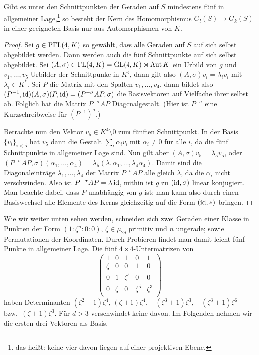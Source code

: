 \begin{lemma}
Gibt es unter den Schnittpunkten der Geraden auf $S$ mindestens fünf in allgemeiner Lage,\footnote{das heißt: keine vier davon liegen auf einer projektiven Ebene.} so besteht der Kern des Homomorphismus $G_l(S) \to G_k(S)$ in einer geeigneten Basis nur aus Automorphismen von $K$.
\end{lemma}
\begin{proof}
Sei $g \in \mathrm{P\Gamma L}(4,K)$ so gewählt, dass alle Geraden auf $S$ auf sich selbst abgebildet werden. Dann werden auch die fünf Schnittpunkte auf sich selbst abgebildet. Sei $(A, \sigma) \in \mathrm{\Gamma L}(4,K) = \mathrm{GL}(4,K) \rtimes \operatorname{Aut} K$ ein Urbild von $g$ und $v_1, \dots, v_5$ Urbilder der Schnittpunke in $K^4$, dann gilt also $(A, \sigma)v_i = \lambda_i v_i$ mit $\lambda_i \in K^*$. Sei $P$ die Matrix mit den Spalten $v_1, \dots, v_4$, dann bildet also $(P^{-1},\operatorname{id})(A,\sigma)(P,\operatorname{id}) = (P^{-\sigma}AP,\sigma)$ die Basisvektoren auf Vielfache ihrer selbst ab. Folglich hat die Matrix $P^{-\sigma}AP$ Diagonalgestalt. (Hier ist $P^{-\sigma}$ eine Kurzschreibweise für $(P^{-1})^\sigma$.)

Betrachte nun den Vektor $v_5 \in K^4 \setminus 0$ zum fünften Schnittpunkt. In der Basis $\{v_i\}_{i<5}$ hat $v_5$ dann die Gestalt $\sum_i \alpha_i v_i$ mit $\alpha_i \neq 0$ für alle $i$, da die fünf Schnittpunkte in allgemeiner Lage sind. Nun gilt aber $(A,\sigma) v_5 = \lambda_5 v_5$, oder $(P^{-\sigma}AP,\sigma)(\alpha_1,\dots,\alpha_4) = \lambda_5(\lambda_1\alpha_1,\dots,\lambda_4\alpha_4)$. Damit sind die Diagonaleinträge $\lambda_1, \dots, \lambda_4$ der Matrix $P^{-\sigma}AP$ alle gleich $\lambda$, da die $\alpha_i$ nicht verschwinden. Also ist $P^{-\sigma}AP = \lambda \operatorname{id}$, mithin ist $g$ zu $(\operatorname{id}, \sigma)$ linear konjugiert. Man beachte dabei, dass $P$ unabhängig von $g$ ist: man kann also durch einen Basiswechsel alle Elemente des Kerns gleichzeitig auf die Form $(\operatorname{id}, *)$ bringen.
\end{proof}
Wie wir weiter unten sehen werden, schneiden sich zwei Geraden einer Klasse in Punkten der Form $(1:\zeta^n:0:0)$, $\zeta \in \mu_{2d}$ primitiv und $n$ ungerade; sowie Permutationen der Koordinaten. Durch Probieren findet man damit leicht fünf Punkte in allgemeiner Lage. Die fünf $4 \times 4$-Untermatrizen von
\begin{equation*}
\begin{pmatrix}
1 & 0 & 1 & 0 & 1 \\
\zeta & 0 & 0 & 1 & 0 \\
0 & 1 & \zeta^3 & 0 & 0 \\
0 & \zeta & 0 & \zeta^5 & \zeta^3 \\
\end{pmatrix}
\end{equation*}
haben Determinanten $(\zeta^2-1)\zeta^4$, $(\zeta+1)\zeta^4$, $-(\zeta^3+1)\zeta^3$, $-(\zeta^3+1)\zeta^6$ bzw.~$(\zeta+1)\zeta^3$. Für $d>3$ verschwindet keine davon. Im Folgenden nehmen wir die ersten drei Vektoren als Basis.

